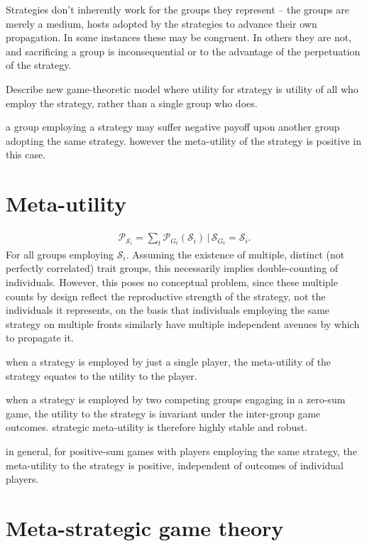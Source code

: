 \documentclass[twocolumn, aps, rmp, amsmath, amssymb, nofootinbib, superscriptaddress, longbibliography, floatfix, table-of-contents, eqsecnum]{revtex4-1}
\begin{document}
Strategies don't inherently work for the groups they represent -- the groups are merely a medium, hosts adopted by the strategies to advance their own propagation. In some instances these may be congruent. In others they are not, and sacrificing a group is inconsequential or to the advantage of the perpetuation of the strategy.

Describe new game-theoretic model where utility for strategy is utility of all who employ the strategy, rather than a single group who does.

a group employing a strategy may suffer negative payoff upon another group adopting the same strategy. however the meta-utility of the strategy is positive in this case.

\section{Meta-utility}

\begin{align}
\mathcal{P}_{\mathcal{S}_i} = \sum_{t} \mathcal{P}_{G_t}(\mathcal{S}_i)\, |\, \mathcal{S}_{G_t} = \mathcal{S}_i.
\end{align}
For all groups employing $\mathcal{S}_i$. Assuming the existence of multiple, distinct (not perfectly correlated) trait groups, this necessarily implies double-counting of individuals. However, this poses no conceptual problem, since these multiple counts by design reflect the reproductive strength of the strategy, not the individuals it represents, on the basis that individuals employing the same strategy on multiple fronts similarly have multiple independent avenues by which to propagate it.

when a strategy is employed by just a single player, the meta-utility of the strategy equates to the utility to the player.

when a strategy is employed by two competing groups engaging in a zero-sum game, the utility to the strategy is invariant under the inter-group game outcomes. strategic meta-utility is therefore highly stable and robust.

in general, for positive-sum games with players employing the same strategy, the meta-utility to the strategy is positive, independent of outcomes of individual players.

\section{Meta-strategic game theory}
\end{document}

